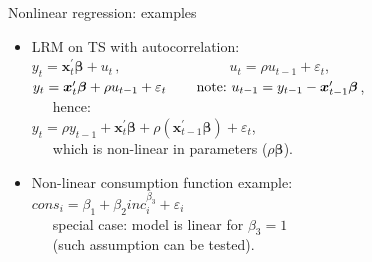 \documentclass{beamer}
\begin{document}
\begin{frame}{Nonlinear regression: examples}
\begin{itemize}
    \item LRM on TS with autocorrelation:\\ \bigskip
    $y_t=\bm{x}_t^{\prime} \bm{\beta} + u_t \,,\qquad \qquad \qquad~~~~~~~\, u_t = \rho u_{t-1}+\varepsilon_t$,\\ \smallskip
    $y_t=\bm{x}_t^{\prime} \bm{\beta} +\rho u_{t-1}+\varepsilon_t \, \qquad \textnormal{note:~} u_{t-1} = y_{t-1} - \bm{x}_{t-1}^{\prime} \bm{\beta} $, \\ \smallskip ~~~hence: \\ \smallskip
    $y_t= \rho y_{t-1} + \bm{x}_t^{\prime} \bm{\beta} + \rho (\bm{x}_{t-1}^{\prime} \bm{\beta}) + \varepsilon_t$, \\ \smallskip ~~~which is non-linear in parameters ($\rho \bm{\beta}$). \\ \bigskip
    \item Non-linear consumption function example:\\ \bigskip 
    $\textit{cons}_i = \beta_1 + \beta_2 \textit{inc}_i^{\beta_3} + \varepsilon_i$
    \\ \medskip ~~~special case: model is linear for $\beta_3 = 1$ \\~~~(such assumption can be tested).
\end{itemize}





    
\end{frame}
\end{document}
